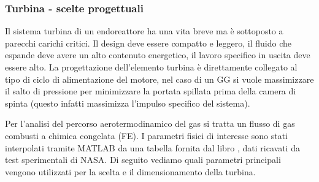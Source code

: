 \subsubsection{Turbina - scelte progettuali}

Il sistema turbina di un endoreattore ha una vita breve ma è sottoposto a parecchi carichi critici. Il design deve essere compatto e leggero, il fluido che espande deve avere un alto contenuto energetico, il lavoro specifico in uscita deve essere alto. La progettazione dell'elemento turbina è direttamente collegato al tipo di ciclo di alimentazione del motore, nel caso di un GG si vuole massimizzare il salto di pressione per minimizzare la portata spillata prima della camera di spinta (questo infatti massimizza l'impulso specifico del sistema). 

Per l'analisi del percorso aerotermodinamico del gas si tratta un flusso di gas combusti a chimica congelata (FE). I parametri fisici di interesse sono stati interpolati tramite MATLAB da una tabella fornita dal libro \cite{AIAA_book_2}, dati ricavati da test sperimentali di NASA. Di seguito vediamo quali parametri principali vengono utilizzati per la scelta e il dimensionamento della turbina. 

